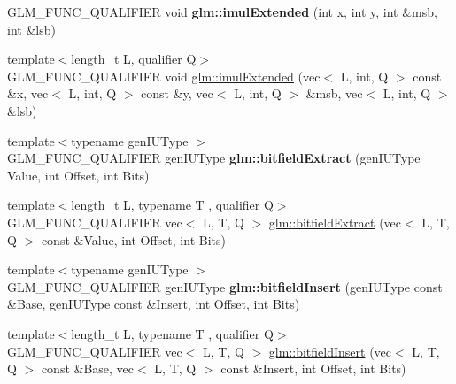 \begin{DoxyCompactItemize}
\item 
\mbox{\label{func__integer_8inl_a940501aa5c66bc19f9ba6ddfe0110097}} 
G\+L\+M\+\_\+\+F\+U\+N\+C\+\_\+\+Q\+U\+A\+L\+I\+F\+I\+ER void {\bfseries glm\+::imul\+Extended} (int x, int y, int \&msb, int \&lsb)
\item 
{\footnotesize template$<$length\+\_\+t L, qualifier Q$>$ }\\G\+L\+M\+\_\+\+F\+U\+N\+C\+\_\+\+Q\+U\+A\+L\+I\+F\+I\+ER void \hyperlink{group__core__func__integer_gac0c510a70e852f57594a9141848642e3}{glm\+::imul\+Extended} (vec$<$ L, int, Q $>$ const \&x, vec$<$ L, int, Q $>$ const \&y, vec$<$ L, int, Q $>$ \&msb, vec$<$ L, int, Q $>$ \&lsb)
\item 
\mbox{\label{func__integer_8inl_ab781f965cc1130fc70a0a8aaf50e6813}} 
{\footnotesize template$<$typename gen\+I\+U\+Type $>$ }\\G\+L\+M\+\_\+\+F\+U\+N\+C\+\_\+\+Q\+U\+A\+L\+I\+F\+I\+ER gen\+I\+U\+Type {\bfseries glm\+::bitfield\+Extract} (gen\+I\+U\+Type Value, int Offset, int Bits)
\item 
{\footnotesize template$<$length\+\_\+t L, typename T , qualifier Q$>$ }\\G\+L\+M\+\_\+\+F\+U\+N\+C\+\_\+\+Q\+U\+A\+L\+I\+F\+I\+ER vec$<$ L, T, Q $>$ \hyperlink{group__core__func__integer_ga346b25ab11e793e91a4a69c8aa6819f2}{glm\+::bitfield\+Extract} (vec$<$ L, T, Q $>$ const \&Value, int Offset, int Bits)
\item 
\mbox{\label{func__integer_8inl_acec32bd3c6eb5719c5aea5b423085ae6}} 
{\footnotesize template$<$typename gen\+I\+U\+Type $>$ }\\G\+L\+M\+\_\+\+F\+U\+N\+C\+\_\+\+Q\+U\+A\+L\+I\+F\+I\+ER gen\+I\+U\+Type {\bfseries glm\+::bitfield\+Insert} (gen\+I\+U\+Type const \&Base, gen\+I\+U\+Type const \&Insert, int Offset, int Bits)
\item 
{\footnotesize template$<$length\+\_\+t L, typename T , qualifier Q$>$ }\\G\+L\+M\+\_\+\+F\+U\+N\+C\+\_\+\+Q\+U\+A\+L\+I\+F\+I\+ER vec$<$ L, T, Q $>$ \hyperlink{group__core__func__integer_ga2e82992340d421fadb61a473df699b20}{glm\+::bitfield\+Insert} (vec$<$ L, T, Q $>$ const \&Base, vec$<$ L, T, Q $>$ const \&Insert, int Offset, int Bits)
\item 
\mbox{\label{func__integer_8inl_abaf011115ec2807a589806911d97c10e}} 

\end{DoxyCompactItemize}
